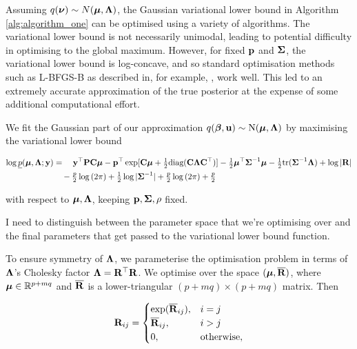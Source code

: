 \documentclass{article}[12pt]
\newcommand{\mgc}[1]{{\color{blue}#1}}
\begin{document}
	Assuming $q({\boldsymbol \nu}) \sim N({\boldsymbol \mu}, {\boldsymbol \Lambda})$, the Gaussian variational lower bound in Algorithm
	\ref{alg:algorithm_one} can be optimised using a variety of algorithms. The variational lower bound is not
	necessarily unimodal, leading to potential difficulty in optimising to the global maximum. However, for fixed
	${\bf p}$ and ${\boldsymbol \Sigma}$, the variational lower bound is log-concave, and so standard optimisation methods such as
	L-BFGS-B as described in, for example, \cite{Liu1989}, work well. This led to an extremely accurate
	approximation of the true posterior at the expense of some additional computational effort.
	
	\noindent We fit the Gaussian part of our approximation $q({\boldsymbol \beta}, {\bf u}) \sim \text{N}({\boldsymbol \mu}, {\boldsymbol \Lambda})$ by maximising the
	variational lower bound
	
	\begin{align*}
		\log \underline{p}({\boldsymbol \mu}, {\boldsymbol \Lambda}; {\bf y}) & = \quad {\bf y}^\top{\bf P} {\bf C} {\boldsymbol\mu} - {\bf p}^\top \exp[{\bf C} {\boldsymbol \mu} + \tfrac{1}{2} \text{diag}({\bf C} {\boldsymbol \Lambda} {\bf C}^\top)] - \tfrac{1}{2} {\boldsymbol \mu}^\top {\boldsymbol\Sigma}^{-1} {\boldsymbol \mu} - \tfrac{1}{2} \text{tr}{({\boldsymbol\Sigma}^{-1} {\boldsymbol\Lambda})} + \log{|{\bf R}|} \\
		                                        & \quad - \tfrac{p}{2} \log{(2 \pi)} + \tfrac{1}{2} \log{|{\boldsymbol\Sigma}^{-1}|} + \tfrac{p}{2} \log{(2 \pi)} + \tfrac{p}{2}                                                                              \\
	\end{align*}
	
	\noindent with respect to ${\boldsymbol \mu}, {\boldsymbol \Lambda}$, keeping ${\bf p}, {\boldsymbol \Sigma}, \rho$ fixed.
	
	\mgc{I need to distinguish between the parameter space that we're optimising over and the final parameters
	that get passed to the variational lower bound function.}
	
	\noindent To ensure symmetry of ${\boldsymbol \Lambda}$, we parameterise the optimisation problem in terms of ${\boldsymbol \Lambda}$'s
	Cholesky factor  ${\boldsymbol \Lambda} = {\bf R}^\top {\bf R}$. We optimise over the space $({\boldsymbol \mu}, \overline{{\bf R}})$, where ${\boldsymbol \mu}
	\in {\mathbb{R}}^{p + mq}$ and $\overline{{\bf R}}$ is a lower-triangular $(p + mq) \times (p + mq)$ matrix. Then
	
	\begin{equation*}
		{\bf R}_{ij} =
		\begin{cases}
			\exp(\overline{{\bf R}}_{ij}), & i = j             \\
			\overline{{\bf R}}_{ij},       & i > j             \\
			0,                         & \text{otherwise}, 
		\end{cases}
	\end{equation*}
	
\end{document}

